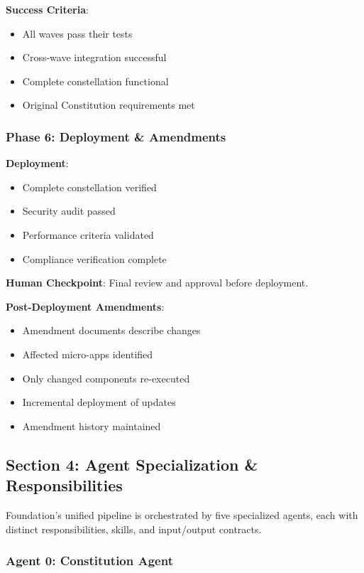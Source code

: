 \documentclass[12pt,letterpaper]{article}
\begin{document}
\textbf{Success Criteria}:
\begin{itemize}
    \item All waves pass their tests
    \item Cross-wave integration successful
    \item Complete constellation functional
    \item Original Constitution requirements met
\end{itemize}

\subsubsection{Phase 6: Deployment \& Amendments}

\textbf{Deployment}:
\begin{itemize}
    \item Complete constellation verified
    \item Security audit passed
    \item Performance criteria validated
    \item Compliance verification complete
\end{itemize}

\textbf{Human Checkpoint}: Final review and approval before deployment.

\textbf{Post-Deployment Amendments}:
\begin{itemize}
    \item Amendment documents describe changes
    \item Affected micro-apps identified
    \item Only changed components re-executed
    \item Incremental deployment of updates
    \item Amendment history maintained
\end{itemize}

\subsection{Section 4: Agent Specialization \& Responsibilities}

Foundation's unified pipeline is orchestrated by five specialized agents, each with distinct responsibilities, skills, and input/output contracts.

\subsubsection{Agent 0: Constitution Agent}
\end{document}
